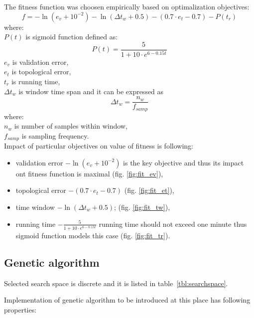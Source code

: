 \documentclass[a4paper,jurnal]{IEEEtran}
\begin{document}
The fitness function was choosen empirically based on optimalization objectives:
\[ f = -\ln(e_v+10^{-2 }) - \ln(\Delta t_w+0.5) - (0.7\cdot e_t-0.7) - P(t_r) \]
where:\\
$ P(t) $ is sigmoid function defined as:
\[ P(t) = \frac{5}{1+10\cdot e^{6-0.15t}} \]
$ e_v $ is validation error,\\
$ e_t $ is topological error,\\
$ t_r $ is running time,\\
$ \Delta t_w $ is window time span and it can be expressed as 
\[  \Delta t_w = \frac{n_w}{f_{samp}}  \]
where:\\
$ n_w $ is number of samples within window,\\
$ f_{samp} $ is sampling frequency.
\\

Impact of particular objectives on value of fitness is following:
\begin{itemize}
	\item validation error $ -\ln(e_v+10^{-2 }) $ is the key objective and thus its impact
	ont fitness function is maximal (fig. \ref{fig:fit_ev}),
	\item topological error $ -(0.7\cdot e_t-0.7) $ (fig. \ref{fig:fit_et}),
	\item time window $ -\ln(\Delta t_w+0.5) $; (fig. \ref{fig:fit_tw}),
	\item running time $ -\frac{5}{1+10\cdot e^{6-0.15t}} $ running
	time should not exceed one minute thus sigmoid function models this case (fig.
	 \ref{fig:fit_tr}).
\end{itemize}

\subsection{Genetic algorithm}
Selected search space is discrete and it is listed  in table~\ref{tbl:searchspace}.%

Implementation of genetic algorithm to be introduced at this place
has following properties:
\end{document}

